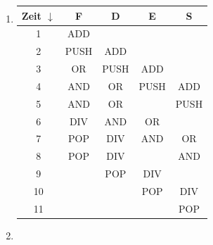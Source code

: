 \documentclass[a4paper, 12pt, margins=2cm]{homework}
\begin{document}
  \begin{problem}
  \end{problem}
  \begin{solution}\hfill
    
    \begin{enumerate}[label=(\alph*)]\itemsep0pt
      \item \hfill
        \begin{center}
          \begin{tabular}{|c||c|c|c|c|}
            \hline
            Zeit $\downarrow$ & F    & D    & E    & S    \\ \hline \hline
            1    & ADD  &      &      &      \\ \hline
            2    & PUSH & ADD  &      &      \\ \hline
            3    & OR   & PUSH & ADD  &      \\ \hline
            4    & AND  & OR   & PUSH & ADD  \\ \hline
            5    & AND  & OR   &      & PUSH \\ \hline
            6    & DIV  & AND  & OR   &      \\ \hline
            7    & POP  & DIV  & AND  & OR   \\ \hline
            8    & POP  & DIV  &      & AND  \\ \hline
            9    &      & POP  & DIV  &      \\ \hline
            10   &      &      & POP  & DIV  \\ \hline
            11   &      &      &      & POP  \\ \hline
         \end{tabular}
        \end{center}

      \item \hfill

      \centering{}
    \end{enumerate}
  \end{solution}
\end{document}
